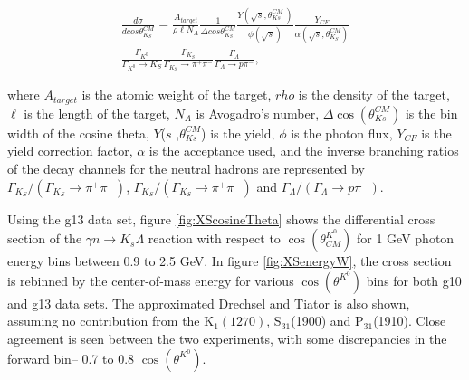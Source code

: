 \documentclass[prb,10pt,twocolumn,tightenlines,superscriptaddress]{revtex4-1}
\begin{document}
\vspace{5mm} %
\begin{equation} 
\begin{split}
\frac{d\sigma}{dcos\theta^{CM}_{K_{S}}}=\frac{A_{target}}{\rho\ell N_A}\frac{1}{\Delta cos\theta^{CM}_{K_{S}}}\frac{Y\left(\sqrt{s},\theta^{CM}_{Ks}\ \right)}{\phi\left(\sqrt{s}\right)}\frac{Y_{CF}}{\alpha\left(\sqrt{s},\theta^{CM}_{K_{S}}\right)}   \\
\frac{\Gamma_{K^{0}}}{\Gamma_{K^{0}}\rightarrow K_{S}}\frac{\Gamma_{K_{S}}}{\Gamma_{K_{S}}\rightarrow\pi^+\pi^-}\frac{\Gamma_{\Lambda }}{\Gamma_{\Lambda}\rightarrow p\pi^-},
\label{EQ12}  
\end{split}                                                
\end{equation} 
\vspace{5mm} %

\noindent where $A_{target}$ is the atomic weight of the target, $rho$ is the density of the target, $\ell$ is the length of the target, $N_{A}$ is Avogadro's number, $\Delta\cos({\theta}^{CM}_{Ks})$ is the bin width of the cosine theta, $Y$($s$ ,${\theta}^{CM}_{Ks}$) is the yield, $\phi$ is the photon flux, $Y_{CF}$ is the yield correction factor, $\alpha$ is the acceptance used, and the inverse branching ratios of the decay channels for the neutral hadrons are represented by $\Gamma_{K_{S}}/(\Gamma_{K_{S}}\rightarrow\pi^{+}\pi^{-})$, $\Gamma_{K_{S}}/(\Gamma_{K_{S}}\rightarrow\pi^{+}\pi^{-})$  and $\Gamma_{\Lambda}/(\Gamma_{\Lambda}\rightarrow p\pi^{-})$.

Using the g13 data set, figure \ref{fig:XScosineTheta} shows the differential cross section of the  $\gamma n \rightarrow K_{s}\Lambda$ reaction with respect to $\cos(\theta^{K^{0}}_{CM})$ for 1 GeV photon energy bins between 0.9 to 2.5 GeV. In figure \ref{fig:XSenergyW},  the cross section is rebinned by the center-of-mass energy for various $\cos(\theta^{K^{0}})$ bins for both g10 and g13 data sets.  The approximated Drechsel and Tiator is also shown, assuming no contribution from the K$_{1}(1270)$, S$_{31}$(1900) and P$_{31}$(1910). Close agreement is seen between the two experiments, with some discrepancies in the forward bin-- 0.7 to 0.8 $\cos(\theta^{K^{0}})$.
\end{document}
